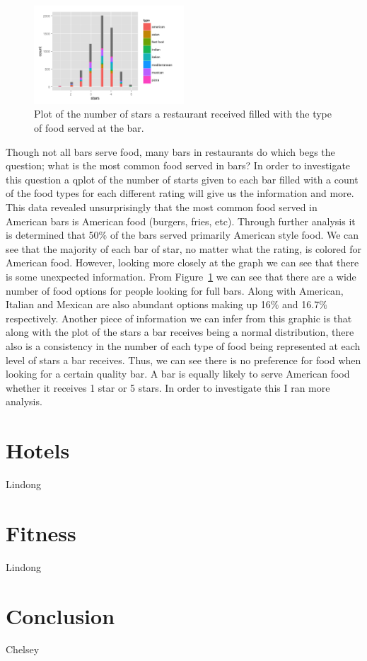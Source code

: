 \documentclass[11pt]{article}
\begin{document}
\begin{figure}[h!]
  \caption{Plot of the number of stars a restaurant received filled with the type of food served at the bar.}
  \centering
  \label{food}
    \includegraphics[width=0.5\textwidth]{Food_bars.png}
\end{figure}

Though not all bars serve food, many bars in restaurants do which begs the question; what is the most common food served in bars?  In order to investigate this question a qplot of the number of starts given to each bar filled with a count of the food types for each different rating will give us the information and more.  This data revealed unsurprisingly that the most common food served in American bars is American food (burgers, fries, etc). Through further analysis it is determined that 50$\%$ of the bars served primarily American style food.  We can see that the majority of each bar of star, no matter what the rating, is colored for American food.  However, looking more closely at the graph we can see that there is some unexpected information.  From Figure~\ref{food} we can see that there are a wide number of food options for people looking for full bars.  Along with American, Italian and Mexican are also abundant options making up 16$\%$ and 16.7$\%$ respectively.  Another piece of information we can infer from this graphic is that along with the plot of the stars a bar receives being a normal distribution, there also is a consistency in the number of each type of food being represented at each level of stars a bar receives.  Thus, we can see there is no preference for food when looking for a certain quality bar. A bar is equally likely to serve American food whether it receives 1 star or 5 stars.  In order to investigate this I ran more analysis.  





\section{Hotels}

Lindong

\section{Fitness}

Lindong


\section{Conclusion}


Chelsey
\end{document}
